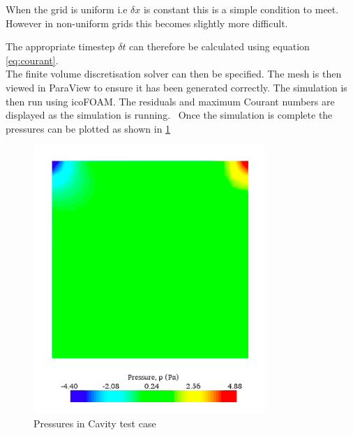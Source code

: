\documentclass[]{report}
\begin{document}
When the grid is uniform i.e $\delta x$ is constant this is a simple condition to meet. However in non-uniform grids this becomes slightly more difficult. 
 
The appropriate timestep $\delta t$ can therefore be calculated using equation \ref{eq:courant}. 
\\
The finite volume discretisation solver can then be specified. The mesh is then viewed in ParaView to ensure it has been generated correctly. The simulation is then run using icoFOAM. The residuals and maximum Courant numbers are displayed as the simulation is running.
\
Once the simulation is complete the pressures can be plotted as shown in \ref{fig:cavity_pressure}

\begin{figure}[h]
	\centering
	\includegraphics[scale=0.5]{cavity_pressure}
	\caption{Pressures in Cavity test case}
	\label{fig:cavity_pressure}
\end{figure}
\end{document}

